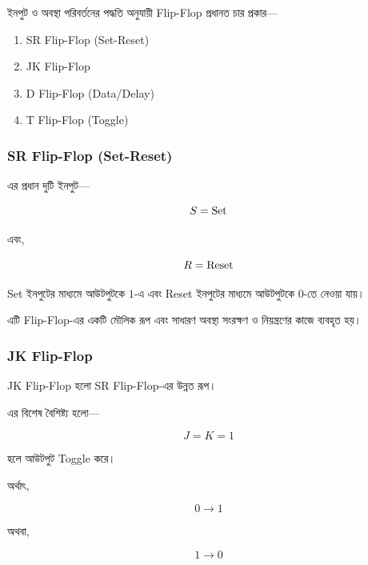 ইনপুট ও অবস্থা পরিবর্তনের পদ্ধতি অনুযায়ী
\textenglish{Flip-Flop} প্রধানত চার প্রকার—

\begin{enumerate}[leftmargin=*,itemsep=3pt]

    \item \textenglish{SR Flip-Flop (Set-Reset)}
    \item \textenglish{JK Flip-Flop}
    \item \textenglish{D Flip-Flop (Data/Delay)}
    \item \textenglish{T Flip-Flop (Toggle)}

\end{enumerate}



\subsubsection*{\textenglish{SR Flip-Flop (Set-Reset)}}

এর প্রধান দুটি ইনপুট—

\[
S=\text{\textenglish{Set}}
\]

এবং,

\[
R=\text{\textenglish{Reset}}
\]

\textenglish{Set} ইনপুটের মাধ্যমে আউটপুটকে \(1\)-এ
এবং \textenglish{Reset} ইনপুটের মাধ্যমে আউটপুটকে \(0\)-তে
নেওয়া যায়।

এটি \textenglish{Flip-Flop}-এর একটি মৌলিক রূপ এবং সাধারণ
অবস্থা সংরক্ষণ ও নিয়ন্ত্রণের কাজে ব্যবহৃত হয়।



\subsubsection*{\textenglish{JK Flip-Flop}}

\textenglish{JK Flip-Flop} হলো
\textenglish{SR Flip-Flop}-এর উন্নত রূপ।

এর বিশেষ বৈশিষ্ট্য হলো—

\[
J=K=1
\]

হলে আউটপুট \textenglish{Toggle} করে।

অর্থাৎ,

\[
0\rightarrow1
\]

অথবা,

\[
1\rightarrow0
\]

